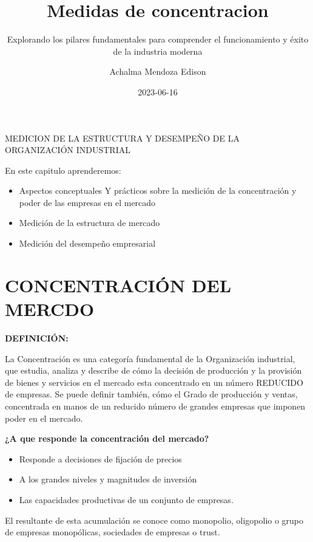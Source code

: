\documentclass[
  letterpaper,
  DIV=11,
  numbers=noendperiod]{scrartcl}
\title{Medidas de concentracion}
\subtitle{Explorando los pilares fundamentales para comprender el
funcionamiento y éxito de la industria moderna}
\author{Achalma Mendoza Edison}
\date{2023-06-16}
\begin{document}
\maketitle
\ifdefined\Shaded\renewenvironment{Shaded}{\begin{tcolorbox}[sharp corners, borderline west={3pt}{0pt}{shadecolor}, interior hidden, enhanced, breakable, boxrule=0pt, frame hidden]}{\end{tcolorbox}}\fi

MEDICION DE LA ESTRUCTURA Y DESEMPEÑO DE LA ORGANIZACIÓN INDUSTRIAL

En este capitulo aprenderemos:

\begin{itemize}
\item
  Aspectos conceptuales Y prácticos sobre la medición de la
  concentración y poder de las empresas en el mercado
\item
  Medición de la estructura de mercado
\item
  Medición del desempeño empresarial
\end{itemize}

\hypertarget{concentraciuxf3n-del-mercdo}{%
\section{CONCENTRACIÓN DEL MERCDO}\label{concentraciuxf3n-del-mercdo}}

\textbf{DEFINICIÓN:}

La Concentración es una categoría fundamental de la Organización
industrial, que estudia, analiza y describe de cómo la decisión de
producción y la provisión de bienes y servicios en el mercado esta
concentrado en un número REDUCIDO de empresas. Se puede definir también,
cómo el Grado de producción y ventas, concentrada en manos de un
reducido número de grandes empresas que imponen poder en el mercado.

\textbf{¿A que responde la concentración del mercado?}

\begin{itemize}
\item
  Responde a decisiones de fijación de precios
\item
  A los grandes niveles y magnitudes de inversión
\item
  Las capacidades productivas de un conjunto de empresas.
\end{itemize}

El resultante de esta acumulación se conoce como monopolio, oligopolio o
grupo de empresas monopólicas, sociedades de empresas o trust.
\end{document}

